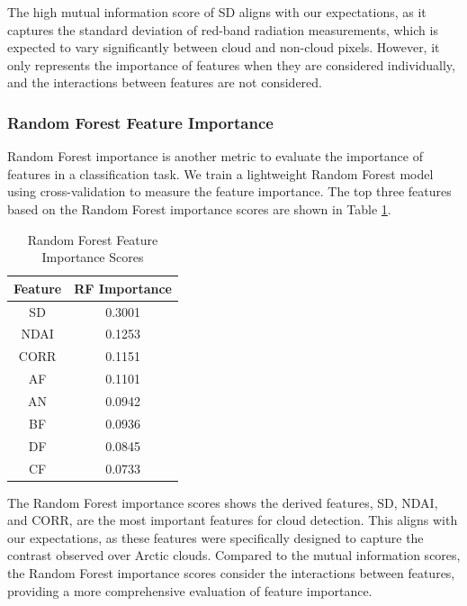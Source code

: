 \documentclass[10pt,letterpaper]{article}
\begin{document}
The high mutual information score of SD aligns with our expectations, as it captures the standard deviation of red-band radiation measurements, which is expected to vary significantly between cloud and non-cloud pixels. However, it only represents the importance of features when they are considered individually, and the interactions between features are not considered.

\subsubsection{Random Forest Feature Importance}

Random Forest importance is another metric to evaluate the importance of features in a classification task. We train a lightweight Random Forest model using cross-validation to measure the feature importance. The top three features based on the Random Forest importance scores are shown in Table \ref{tab:rf_scores}.

\begin{table}[ht]
    \centering
    \caption{Random Forest Feature Importance Scores}
    \label{tab:rf_scores}
    \begin{tabular}{cc}
    \hline
    \textbf{Feature} & \textbf{RF Importance} \\ \hline
    SD               & 0.3001                 \\
    NDAI             & 0.1253                 \\
    CORR             & 0.1151                 \\
    AF               & 0.1101                 \\
    AN               & 0.0942                 \\
    BF               & 0.0936                 \\
    DF               & 0.0845                 \\
    CF               & 0.0733                
    \end{tabular}
    \end{table}

The Random Forest importance scores shows the derived features, SD, NDAI, and CORR, are the most important features for cloud detection. This aligns with our expectations, as these features were specifically designed to capture the contrast observed over Arctic clouds. Compared to the mutual information scores, the Random Forest importance scores consider the interactions between features, providing a more comprehensive evaluation of feature importance.
\end{document}
